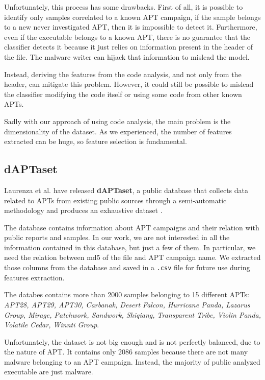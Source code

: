 Unfortunately, this process has some drawbacks. First of all, it is possible to identify only samples correlated to a known APT campaign, if the sample belongs to a new never investigated APT, then it is impossible to detect it. Furthermore, even if the executable belongs to a known APT, there is no guarantee that the classifier detects it because it just relies on information present in the header of the file. The malware writer can hijack that information to mislead the model. 

Instead, deriving the features from the code analysis, and not only from the header, can mitigate this problem. However, it could still be possible to mislead the classifier modifying the code itself or using some code from other known APTs.

Sadly with our approach of using code analysis, the main problem is the dimensionality of the dataset. As we experienced, the number of features extracted can be huge, so feature selection is fundamental.




\subsection{dAPTaset}

Laurenza et al. have released \textbf{dAPTaset}, a public database that collects data related to APTs from existing public sources through a semi-automatic methodology and produces an exhaustive dataset \cite{daptaset}.

The database contains information about APT campaigns and their relation with public reports and samples. In our work, we are not interested in all the information contained in this database, but just a few of them. In particular, we need the relation between md5 of the file and APT campaign name. We extracted those columns from the database and saved in a \texttt{.csv} file for future use during features extraction.

The databes contains more than 2000 samples belonging to 15 different APTs: \textit{APT28,
APT29, APT30, Carbanak, Desert Falcon, Hurricane Panda, Lazarus Group, Mirage, Patchwork,
Sandwork, Shiqiang, Transparent Tribe, Violin Panda, Volatile Cedar, Winnti Group}.

Unfortunately, the dataset is not big enough and is not perfectly balanced, due to the nature of APT. It contains only 2086 samples because there are not many malware belonging to an APT campaign. Instead, the majority of public analyzed executable are just malware.


